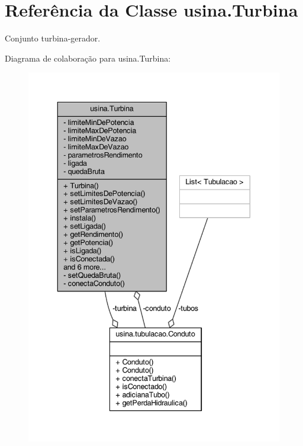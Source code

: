 \hypertarget{classusina_1_1_turbina}{\section{Referência da Classe usina.\-Turbina}
\label{classusina_1_1_turbina}
}


Conjunto turbina-\/gerador.  




Diagrama de colaboração para usina.\-Turbina\-:
\nopagebreak
\begin{figure}[H]
\begin{center}
\leavevmode
\includegraphics[width=339pt]{classusina_1_1_turbina__coll__graph}
\end{center}
\end{figure}
